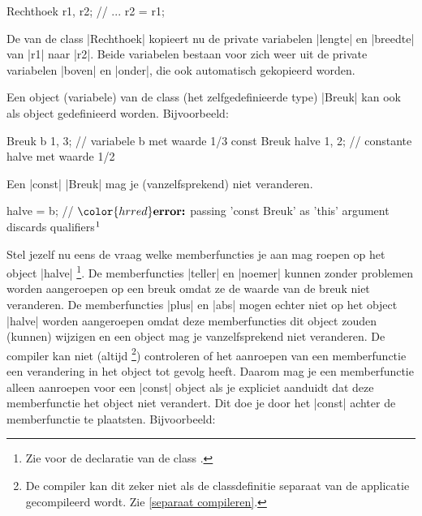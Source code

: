 \begin{cpplstShortInline}
\begin{cpplstfragment}
    Rechthoek r1, r2;
    // ...
    r2 = r1;
\end{cpplstfragment}

De  van de class |Rechthoek| kopieert nu de private variabelen |lengte| en |breedte| van |r1| naar |r2|. Beide variabelen bestaan voor zich weer uit de private variabelen |boven| en |onder|, die ook automatisch gekopieerd worden.

\label{sec:constmember}
Een object (variabele) van de class (het zelfgedefinieerde type) |Breuk| kan ook als  object gedefinieerd worden. 
Bijvoorbeeld:
\begin{cpplstfragment}
    Breuk b {1, 3};           // variabele b met waarde 1/3
    const Breuk halve {1, 2}; // constante halve met waarde 1/2
\end{cpplstfragment}

Een |const| |Breuk| mag je (vanzelfsprekend) niet veranderen.
\begin{cpplstfragment}[mathescape=true]
    halve = b; 
//  $\color{hrred}\textbf{error:}$ passing 'const Breuk' as 'this' argument discards qualifiers$\footnotemark$
\end{cpplstfragment}

Stel jezelf nu eens de vraag welke memberfuncties je aan mag roepen op het object |halve|%
\footnote{%
    Zie  voor de declaratie van de class .
}.
De memberfuncties |teller| en |noemer| kunnen zonder problemen worden aangeroepen op een  breuk omdat ze de waarde van de breuk niet veranderen. 
De memberfuncties |plus| en |abs| mogen echter niet op het object |halve| worden aangeroepen omdat deze memberfuncties dit object zouden (kunnen) wijzigen en een  object mag je vanzelfsprekend niet veranderen. 
De compiler kan niet (altijd%
\footnote{%
    De compiler kan dit zeker niet als de classdefinitie separaat van de applicatie gecompileerd wordt. Zie \cref{separaat compileren}.
}) controleren of het aanroepen van een memberfunctie een verandering in het object tot gevolg heeft. 
Daarom mag je een memberfunctie alleen aanroepen voor een |const| object als je expliciet aanduidt dat deze memberfunctie het object niet verandert. 
Dit doe je door het  |const| achter de memberfunctie te plaatsten. 
Bijvoorbeeld:


\end{cpplstShortInline}
